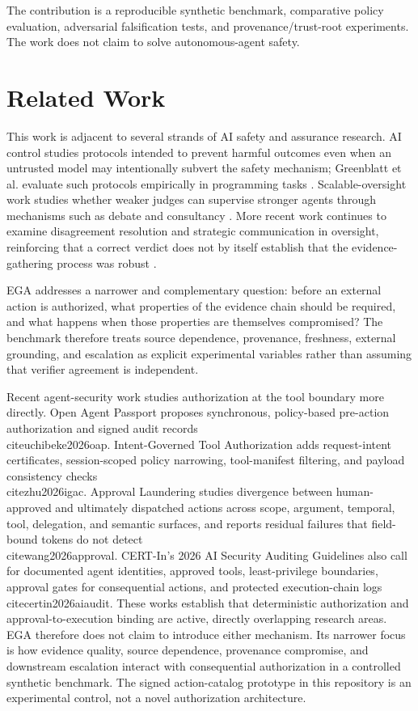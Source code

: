 \documentclass[11pt]{article}
\begin{document}
The contribution is a reproducible synthetic benchmark, comparative policy evaluation, adversarial falsification tests, and provenance/trust-root experiments. The work does not claim to solve autonomous-agent safety.

\section{Related Work}
This work is adjacent to several strands of AI safety and assurance research. AI control studies protocols intended to prevent harmful outcomes even when an untrusted model may intentionally subvert the safety mechanism; Greenblatt et al. evaluate such protocols empirically in programming tasks \cite{greenblatt2024aicontrol}. Scalable-oversight work studies whether weaker judges can supervise stronger agents through mechanisms such as debate and consultancy \cite{kenton2024scalableoversight}. More recent work continues to examine disagreement resolution and strategic communication in oversight, reinforcing that a correct verdict does not by itself establish that the evidence-gathering process was robust \cite{jiang2026disagreement,holland2026debate}.

EGA addresses a narrower and complementary question: before an external action is authorized, what properties of the evidence chain should be required, and what happens when those properties are themselves compromised? The benchmark therefore treats source dependence, provenance, freshness, external grounding, and escalation as explicit experimental variables rather than assuming that verifier agreement is independent.

Recent agent-security work studies authorization at the tool boundary more directly. Open Agent Passport proposes synchronous, policy-based pre-action authorization and signed audit records \\cite{uchibeke2026oap}. Intent-Governed Tool Authorization adds request-intent certificates, session-scoped policy narrowing, tool-manifest filtering, and payload consistency checks \\cite{zhu2026igac}. Approval Laundering studies divergence between human-approved and ultimately dispatched actions across scope, argument, temporal, tool, delegation, and semantic surfaces, and reports residual failures that field-bound tokens do not detect \\cite{wang2026approval}. CERT-In's 2026 AI Security Auditing Guidelines also call for documented agent identities, approved tools, least-privilege boundaries, approval gates for consequential actions, and protected execution-chain logs \\cite{certin2026aiaudit}. These works establish that deterministic authorization and approval-to-execution binding are active, directly overlapping research areas. EGA therefore does not claim to introduce either mechanism. Its narrower focus is how evidence quality, source dependence, provenance compromise, and downstream escalation interact with consequential authorization in a controlled synthetic benchmark. The signed action-catalog prototype in this repository is an experimental control, not a novel authorization architecture.
\end{document}
